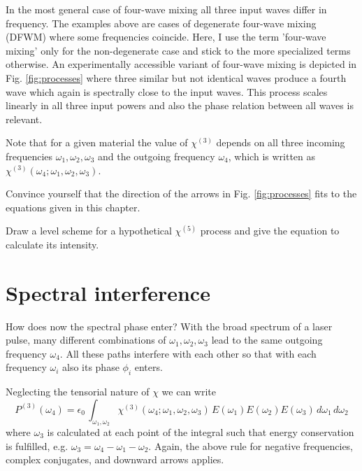 In the most general case of four-wave mixing all three input waves differ in frequency. The examples above are cases of degenerate four-wave mixing (DFWM) where some frequencies coincide. Here, I use the term 'four-wave mixing' only for the non-degenerate case and stick to the more specialized terms otherwise. An experimentally accessible variant of four-wave mixing is depicted in Fig. \ref{fig:processes} where three similar but not identical waves produce a fourth wave which again is spectrally close to the input waves. This process scales linearly in all three input powers and also the phase relation between all waves is relevant.

Note that for a given material the value of $\chi^{(3)} $ depends on all three incoming frequencies $\omega_1, \omega_2, \omega_3$ and the outgoing frequency $\omega_4$, which is written as  $\chi^{(3)}(\omega_4; \omega_1, \omega_2, \omega_3)$. 

\begin{questions}
\item Convince yourself that the direction of the arrows in  Fig. \ref{fig:processes} fits to the equations given in this chapter.

\item Draw a level scheme for a hypothetical $\chi^{(5)}$ process and give the equation to calculate its intensity.
\end{questions}


\section{Spectral interference}

How does now the spectral phase enter? With the broad spectrum of  a laser pulse, many different combinations of $\omega_1, \omega_2, \omega_3$ lead to the same outgoing frequency $\omega_4$. All these paths interfere with each other so that with each frequency $\omega_i$ also its phase $\phi_i$ enters.

Neglecting the tensorial nature of $\chi$ we can write
\begin{equation}
  P^{(3)}(\omega_4) = \epsilon_0 \, 
    \int_{\omega_1, \omega_2} \chi^{(3)}(\omega_4; \omega_1, \omega_2, \omega_3) \,  E(\omega_1) E(\omega_2) E(\omega_3) \, d\omega_1 \, d\omega_2  
\end{equation}	
where $\omega_3$ is calculated at each point of the integral such that energy conservation is fulfilled, e.g. $\omega_3 = \omega_4 - \omega_1 - \omega_2$. Again, the above rule for negative frequencies, complex conjugates, and downward arrows applies.

